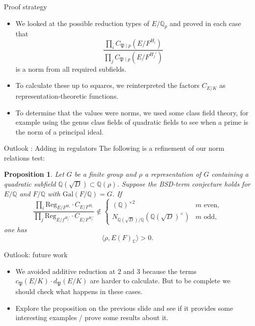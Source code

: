 \documentclass{beamer}
\newcommand{\Gal}{\mathrm{Gal}}
\newcommand{\Reg}{\mathrm{Reg}}
\newcommand{\bQ}{\mathbb{Q}}
\newcommand{\bC}{\mathbb{C}}
\newcommand{\fP}{\mathfrak{P}}
\theoremstyle{plain}
\newtheorem{proposition}[thm]{Proposition}
\begin{document}
\begin{frame}{Proof strategy}
    \begin{itemize}
        \item We looked at the possible reduction types of $E / \bQ_p$ and proved in each case that 
    $$\frac{\prod_i C_{\fP \mid p}(E / F^{H_i})}{\prod_j C_{\fP \mid p}(E / F^{H_j'})}$$
    is a norm from all required subfields. \pause 
    \item 
    To calculate these up to squares, we reinterpreted the factors $C_{E / K}$ as representation-theoretic functions. \pause 
    \item
    To determine that the values were norms, we used some class field theory, for example using the genus class fields of quadratic fields to see when a prime is the norm of a principal ideal. 
    \end{itemize}
 \end{frame}

\begin{frame}{Outlook : Adding in regulators}
The following is a refinement of our norm relations test:

\begin{proposition}
    Let $G$ be a finite group and $\rho$ a representation of $G$ containing a quadratic subfield $\bQ(\sqrt{D}) \subset \bQ(\rho)$. \pause Suppose the BSD-term conjecture holds for $E / \bQ$ and $F / \bQ$ with $\Gal(F / \bQ) = G$. \pause If    \[ \frac{\prod_i \Reg_{E / F^{H_i}} \cdot C_{E/F^{H_i}}}{\prod_j \Reg_{E / f^{H_j'}} \cdot C_{E/F^{H_j'}}} \not\in
    \begin{cases}
        (\bQ)^{\times 2} & m \text{ even,}\\
        N_{\bQ(\sqrt{D}) / \bQ}(\bQ(\sqrt{D})^{\times}) & m \text{ odd,}
    \end{cases}\]  one has 
    \[ \langle \rho, E(F)_{\bC} \rangle > 0 .\] 
\end{proposition}
\end{frame}

\begin{frame}{Outlook: future work}
\begin{itemize}
    \item We avoided additive reduction at $2$ and $3$ because the terms $c_{\fP}(E / K) \cdot d_{\fP}(E / K)$ are harder to calculate. But to be complete we should check what happens in these cases. \pause 
    \item Explore the proposition on the previous slide and see if it provides some interesting examples / prove some results about it. 
\end{itemize}
\end{frame}
\end{document}
